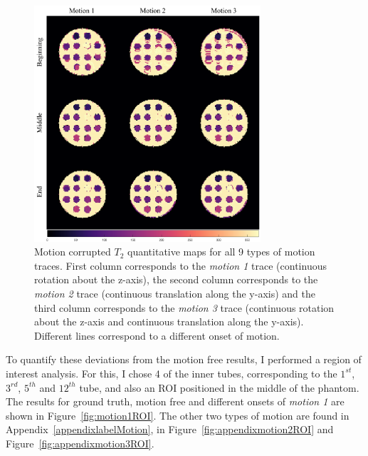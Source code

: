 \begin{figure}[ht]
    \centering
    \includegraphics[width=0.75\textwidth]{images/mrf/T2mapsmotion}
    \caption{Motion corrupted $T_2$ quantitative maps for all 9 types of motion traces. First column corresponds to the \textit{motion 1} trace (continuous rotation about the z-axis), the second column corresponds to the \textit{motion 2} trace (continuous translation along the y-axis) and the third column corresponds to the \textit{motion 3} trace (continuous rotation about the z-axis and continuous translation along the y-axis). Different lines correspond to a different onset of motion. }
    \label{fig:T2mapsmotion}
\end{figure}

\hfill

To quantify these deviations from the motion free results, I performed a region of interest analysis.
For this, I chose 4 of the inner tubes, corresponding to the $1^{st}$, $3^{rd}$, $5^{th}$ and $12^{th}$ tube, and also an ROI positioned in the middle of the phantom.
The results for ground truth, motion free and different onsets of \textit{motion 1} are shown in Figure~\ref{fig:motion1ROI}.
The other two types of motion are found in Appendix~\ref{appendixlabelMotion}, in Figure~\ref{fig:appendixmotion2ROI} and Figure~\ref{fig:appendixmotion3ROI}.

